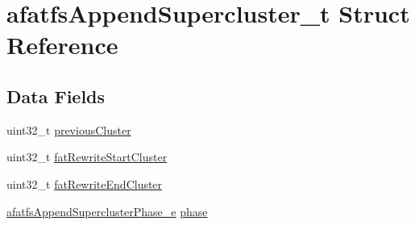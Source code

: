 \hypertarget{structafatfsAppendSupercluster__t}{\section{afatfs\+Append\+Supercluster\+\_\+t Struct Reference}
\label{structafatfsAppendSupercluster__t}
}
\subsection*{Data Fields}
\begin{DoxyCompactItemize}
\item 
uint32\+\_\+t \hyperlink{structafatfsAppendSupercluster__t_a519f8bdd7c70b71003fbed1a68066e21}{previous\+Cluster}
\item 
uint32\+\_\+t \hyperlink{structafatfsAppendSupercluster__t_a8c086886ff7147eaa7f0555e5c7a20fc}{fat\+Rewrite\+Start\+Cluster}
\item 
uint32\+\_\+t \hyperlink{structafatfsAppendSupercluster__t_ac1edbdf37acffd91580481e3715c75f9}{fat\+Rewrite\+End\+Cluster}
\item 
\hyperlink{asyncfatfs_8c_ad7d0f96f3d6236824b297b4c6ce5dd2d}{afatfs\+Append\+Supercluster\+Phase\+\_\+e} \hyperlink{structafatfsAppendSupercluster__t_af9cbd3193b72f73cf18571c3d9ba64aa}{phase}
\end{DoxyCompactItemize}


